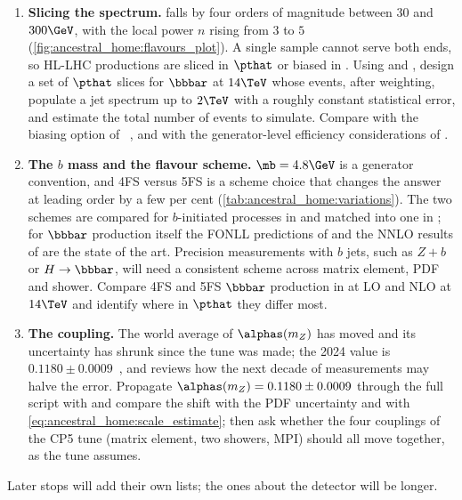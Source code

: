 \begin{enumerate}
    positive by construction~\cite{Alioli:2010xd}, and on the sample side,
    positive resampling~\cite{Andersen:2020sjs}, cell
    resampling~\cite{Andersen:2021mvw} and neural
    resampling~\cite{Nachman:2020fff}. Generate $pp\to\bbbar$ at NLO in \MG
    at $14\TeV$ with our cut, measure the negative-weight fraction, estimate
    the simulation CPU it wastes per unit of statistical precision, and ask
    which of the remedies is usable in a CMS production.
  \item \textbf{Slicing the spectrum.} 
    falls by four orders of magnitude between $30$ and $300\GeV$, with the
    local power $n$ rising from $3$ to $5$
    (\cref{fig:ancestral_home:flavours_plot}). A single sample cannot serve
    both ends, so HL-LHC productions are sliced in $\pthat$ or biased in
    \pt. Using  and , design a set of $\pthat$
    slices for $\bbbar$ at $14\TeV$ whose events, after weighting, populate
    a jet \pt spectrum up to $2\TeV$ with a roughly constant statistical
    error, and estimate the total number of events to simulate. Compare with
    the biasing option  of
    \PYTHIA~\cite{Bierlich:2022pfr}, and with the generator-level
    efficiency considerations of \cite{HSFPhysicsEventGeneratorWG:2020gxw}.
  \item \textbf{The $b$ mass and the flavour scheme.} $\mb=4.8\GeV$ is a
    generator convention, and 4FS versus 5FS is a scheme choice that
    changes the answer at leading order by a few per cent
    (\cref{tab:ancestral_home:variations}). The two schemes are compared for
    $b$-initiated processes in \cite{Maltoni:2012pa} and matched into one in
    \cite{Forte:2015hba}; for $\bbbar$ production itself the FONLL
    predictions of \cite{Cacciari:2012ny} and the NNLO results of
    \cite{Catani:2020kkl} are the state of the art. Precision measurements
    with $b$ jets, such as $Z+b$ or $H\to\bbbar$, will need a consistent
    scheme across matrix element, PDF and shower. Compare 4FS and 5FS
    $\bbbar$ production in \MG at LO and NLO at $14\TeV$ and identify where
    in $\pthat$ they differ most.
  \item \textbf{The coupling.} The world average of $\alphas(m_Z)$ has
    moved and its uncertainty has shrunk since the tune was made; the 2024
    value is $0.1180\pm0.0009$~\cite{ParticleDataGroup:2024cfk}, and
    \cite{dEnterria:2022hzv} reviews how the next decade of measurements may
    halve the error. Propagate $\alphas(m_Z)=0.1180\pm0.0009$ through the
    full script with  and compare the shift with the PDF
    uncertainty and with \cref{eq:ancestral_home:scale_estimate}; then ask
    whether the four couplings of the CP5 tune (matrix element, two
    showers, MPI) should all move together, as the tune assumes.
\end{enumerate}
Later stops will add their own lists; the ones about the detector will be
longer.
